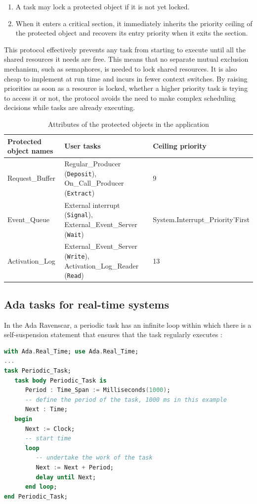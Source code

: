 \documentclass{article}
\begin{document}
\begin{enumerate}
   \item A task may lock a protected object if it is not yet locked.
   \item When it enters a critical section, it immediately inherits the priority ceiling of the protected object and recovers its entry priority when it exits the section.
\end{enumerate}

This protocol effectively prevents any task from starting to execute until all the shared resources it needs are free. This means that no separate mutual exclusion mechanism, such as semaphores, is needed to lock shared resources. It is also cheap to implement at run time and incurs in fewer context switches. By raising priorities as soon as a resource is locked, whether a higher priority task is trying to access it or not, the protocol avoids the need to make complex scheduling decisions while tasks are already executing.

\begin{table}[!htbp]
   \centering
   \begin{tabular}{lll}
     \toprule
     Protected object names & User tasks & Ceiling priority  \\
     \midrule
     Request\_Buffer & Regular\_Producer (\texttt{Deposit}), On\_Call\_Producer (\texttt{Extract}) & 9 \\
     Event\_Queue & External interrupt (\texttt{Signal}), External\_Event\_Server (\texttt{Wait}) & System.Interrupt\_Priority'First \\
     Activation\_Log & External\_Event\_Server (\texttt{Write}), Activation\_Log\_Reader (\texttt{Read}) & 13 \\
     \bottomrule
   \end{tabular}
   \caption{Attributes of the protected objects in the application \cite{ycs}}
   \label{tab:po-attributes}
\end{table}

\subsection{Ada tasks for real-time systems}

In the Ada Ravenscar, a periodic task has an infinite loop within which there is a self-suspension statement that ensures that the task regularly executes \cite{ada-tasks}:

\begin{lstlisting}[language=Ada]
with Ada.Real_Time; use Ada.Real_Time;
...
task Periodic_Task;
   task body Periodic_Task is
      Period : Time_Span := Milliseconds(1000);
      -- define the period of the task, 1000 ms in this example
      Next : Time;
   begin
      Next := Clock;
      -- start time
      loop
         -- undertake the work of the task
         Next := Next + Period;
         delay until Next;
      end loop;
end Periodic_Task;
\end{lstlisting}
\end{document}
